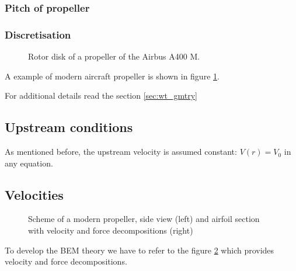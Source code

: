 \subsubsection{\sc Pitch of propeller}


\subsubsection{\sc Discretisation}

\begin{figure}
  \begin{center}
  
  \caption{Rotor disk  of a propeller of the Airbus A400 M.}
  \label{fig:propeller_alone}
  \end{center}
\end{figure}

A example of modern aircraft propeller is shown in figure \ref{fig:propeller_alone}.

For additional details read the section \ref{sec:wt_gmtry}


\subsection{Upstream conditions}

As mentioned before, the upstream velocity is assumed constant: $V(r) = V_0$ in any equation.


\subsection{Velocities}

\begin{figure}[htb]
  \begin{center}
  
  \caption{Scheme of a modern propeller, side view (left) and airfoil section with velocity and force decompositions (right)}
  \label{fig:propeller_side_notations}
  \end{center}
  \end{figure}
  
  To develop the BEM theory we have to refer to the figure \ref{fig:propeller_side_notations} which provides
  velocity and force decompositions.
  
